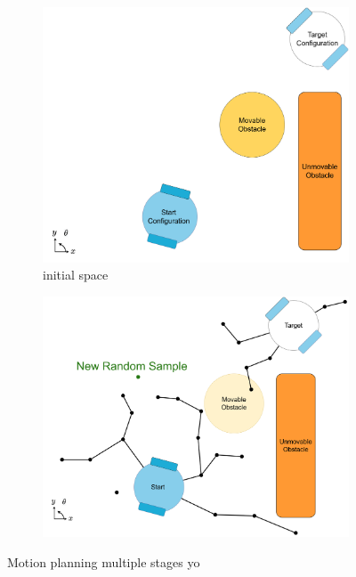 \begin{figure}[H]
    \centering
    \begin{subfigure}{.5\textwidth}
    \centering
    \includegraphics[width=1.0\textwidth]{figures/drawio/mp_init.png}
    \caption{initial space}
    \label{subfig:hey}
    \end{subfigure}%
    \begin{subfigure}{.5\textwidth}
    \centering
    \includegraphics[width=1.0\textwidth]{figures/drawio/mp_new_rand_sample.png}
    \caption{}
    \label{subfig:}
    \end{subfigure}
    \caption{Motion planning multiple stages yo}
    \label{fig:}
\end{figure}




